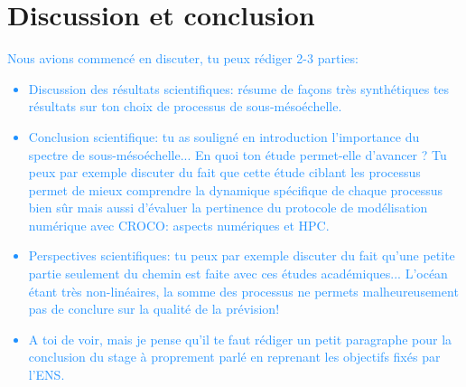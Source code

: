 \documentclass{rapportECC}
\newcommand{\FAadd}[1]{\textcolor{DodgerBlue}{{#1}}}                     %
\begin{document}
\section{Discussion et conclusion}

\FAadd{Nous avions commencé en discuter, tu peux rédiger 2-3 parties:
\begin{itemize}
    \item Discussion des résultats scientifiques: résume de façons très synthétiques tes résultats sur ton choix de processus de sous-mésoéchelle.
    \item Conclusion scientifique: tu as souligné en introduction l'importance du spectre de sous-mésoéchelle... En quoi ton étude permet-elle d'avancer ? Tu peux par exemple discuter du fait que cette étude ciblant les processus permet de mieux comprendre la dynamique spécifique de chaque processus bien sûr mais aussi d'évaluer la pertinence du protocole de modélisation numérique avec CROCO: aspects numériques et HPC.
    \item Perspectives scientifiques: tu peux par exemple discuter du fait qu'une petite partie seulement du chemin est faite avec ces études académiques... L'océan étant très non-linéaires, la somme des processus ne permets malheureusement pas de conclure sur la qualité de la prévision!
    \item A toi de voir, mais je pense qu'il te faut rédiger un petit paragraphe pour la conclusion du stage à proprement parlé en reprenant les objectifs fixés par l'ENS.
    
\end{itemize}}

\newpage


\printbibliography
\end{document}
